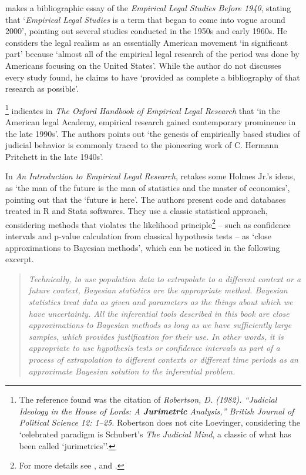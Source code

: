 \documentclass[a4paper]{exam}
\theoremstyle{plain}
\begin{document}
\cite[$P=50, L=0, J=0$]{kritzer2009empirical} makes a bibliographic essay of the \textit{Empirical Legal Studies Before 1940},  stating that `\textit{Empirical Legal Studies} is a term that began to come into vogue around 2000', pointing out several studies conducted in the 1950s and early 1960s. He considers the legal realism as an essentially American movement `in significant part' because `almost all of the empirical legal research of the period was done by Americans focusing on the United States'. While the author do not discusses every study found, he claims to have `provided as complete a bibliography of that research as possible'. 

\cite[$P=1112, L=0, J=1$]{cane2010oxford}\footnote{The reference found was the citation of \textit{Robertson, D. (1982). ``Judicial Ideology in the House of Lords: A \textbf{Jurimetric} Analysis,'' British Journal of Political Science 12: 1–25.} Robertson does not cite Loevinger, considering the `celebrated paradigm is Schubert's \textit{The Judicial Mind}, a classic of what has been called `jurimetrics''.} indicates in \textit{The Oxford Handbook of Empirical Legal Research} that `in the American legal Academy, empirical research gained contemporary prominence in the late 1990s'. The authors points out `the genesis of empirically based studies of judicial behavior is commonly traced to the pioneering work of C. Hermann Pritchett in the late 1940s'.

In \textit{An Introduction to Empirical Legal Research}, \cite[$P=324, L=0, J=0$]{epstein2014introduction} retakes some Holmes Jr.'s ideas, as `the man of the future is the man of statistics and the master of economics', pointing out that the `future is here'. The authors present code and databases treated in R and Stata softwares. They use a classic statistical approach, considering methods that violates the likelihood principle\footnote{For more details see \cite{birnbaum1962foundations}, \cite{wechsler2008birnbaum} and \cite{mayo2014birnbaum}.} -- such as confidence intervals and p-value calculation from classical hypothesis tests -- as `close approximations to Bayesian methods', which can be noticed in the following excerpt.
\begin{quote}
\textit{Technically, to use population data to extrapolate to a different context or a future context, Bayesian statistics are the appropriate method. Bayesian statistics treat data as given and parameters as the things about which we have uncertainty. All the inferential tools described in this book are close approximations to Bayesian methods as long as we have sufficiently large samples, which provides justification for their use. In other words, it is appropriate to use hypothesis tests or confidence intervals as part of a process of extrapolation to different contexts or different time periods as an approximate Bayesian solution to the inferential problem.} \cite[p. 154]{epstein2014introduction}
\end{quote}
\end{document}
